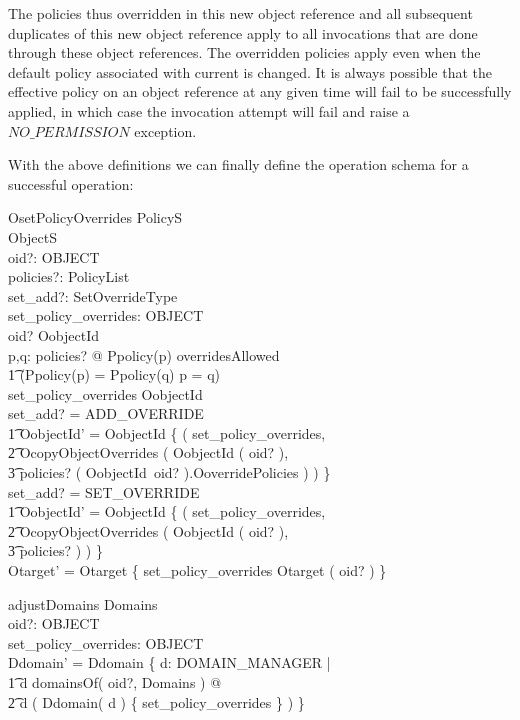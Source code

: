 The policies thus overridden in this new object reference and all subsequent
duplicates of this new object reference apply to all invocations that are done
through these object references. The overridden policies apply even when the
default policy associated with current is changed. It is always possible that
the effective policy on an object reference at any given time will fail to be
successfully applied, in which case the invocation attempt will fail and raise a
$NO\_PERMISSION$ exception.

With the above definitions we can finally define the operation schema for a
successful operation:

\begin{schema}{OsetPolicyOverrides}
  \Xi PolicyS \\
  \Delta ObjectS \\
  oid?: OBJECT \\
  policies?: PolicyList \\
  set\_add?: SetOverrideType \\
  set\_policy\_overrides: OBJECT \\
  \where
  oid? \in \dom OobjectId \\
  \forall p,q: \ran policies? @ Ppolicy(p) \in overridesAllowed \\
  \t1 \land (Ppolicy(p) = Ppolicy(q) \implies p = q) \\

  set\_policy\_overrides \notin \dom OobjectId \\

  set\_add? = ADD\_OVERRIDE \implies \\
  \t1 OobjectId' = OobjectId \cup \{ ( set\_policy\_overrides, \\
  \t2 OcopyObjectOverrides ( OobjectId ( oid? ), \\
  \t3 \ran policies? \cup ( OobjectId~oid? ).OoverridePolicies ) ) \} \\
  set\_add? = SET\_OVERRIDE \implies \\
  \t1 OobjectId' = OobjectId \cup \{ ( set\_policy\_overrides, \\
  \t2 OcopyObjectOverrides ( OobjectId ( oid? ), \\
  \t3 \ran policies? ) ) \} \\
  Otarget' = Otarget \cup \{ set\_policy\_overrides \mapsto Otarget ( oid? ) \}
  \\
\end{schema}
\begin{schema}{adjustDomains}
  \Delta Domains \\
  oid?: OBJECT \\
  set\_policy\_overrides: OBJECT \\
  \where
  Ddomain' = Ddomain \oplus \{ d: DOMAIN\_MANAGER | \\
  \t1 d \in domainsOf( oid?, \theta Domains ) @ \\ 
  \t2 d \mapsto ( Ddomain( d ) \cup \{ set\_policy\_overrides \} ) \}
\end{schema}
